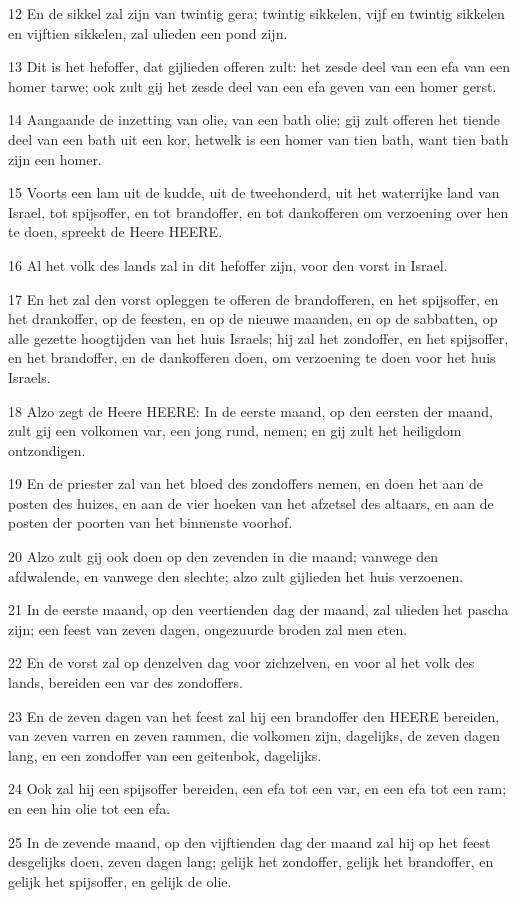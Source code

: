 \par 12 En de sikkel zal zijn van twintig gera; twintig sikkelen, vijf en twintig sikkelen en vijftien sikkelen, zal ulieden een pond zijn.
\par 13 Dit is het hefoffer, dat gijlieden offeren zult: het zesde deel van een efa van een homer tarwe; ook zult gij het zesde deel van een efa geven van een homer gerst.
\par 14 Aangaande de inzetting van olie, van een bath olie; gij zult offeren het tiende deel van een bath uit een kor, hetwelk is een homer van tien bath, want tien bath zijn een homer.
\par 15 Voorts een lam uit de kudde, uit de tweehonderd, uit het waterrijke land van Israel, tot spijsoffer, en tot brandoffer, en tot dankofferen om verzoening over hen te doen, spreekt de Heere HEERE.
\par 16 Al het volk des lands zal in dit hefoffer zijn, voor den vorst in Israel.
\par 17 En het zal den vorst opleggen te offeren de brandofferen, en het spijsoffer, en het drankoffer, op de feesten, en op de nieuwe maanden, en op de sabbatten, op alle gezette hoogtijden van het huis Israels; hij zal het zondoffer, en het spijsoffer, en het brandoffer, en de dankofferen doen, om verzoening te doen voor het huis Israels.
\par 18 Alzo zegt de Heere HEERE: In de eerste maand, op den eersten der maand, zult gij een volkomen var, een jong rund, nemen; en gij zult het heiligdom ontzondigen.
\par 19 En de priester zal van het bloed des zondoffers nemen, en doen het aan de posten des huizes, en aan de vier hoeken van het afzetsel des altaars, en aan de posten der poorten van het binnenste voorhof.
\par 20 Alzo zult gij ook doen op den zevenden in die maand; vanwege den afdwalende, en vanwege den slechte; alzo zult gijlieden het huis verzoenen.
\par 21 In de eerste maand, op den veertienden dag der maand, zal ulieden het pascha zijn; een feest van zeven dagen, ongezuurde broden zal men eten.
\par 22 En de vorst zal op denzelven dag voor zichzelven, en voor al het volk des lands, bereiden een var des zondoffers.
\par 23 En de zeven dagen van het feest zal hij een brandoffer den HEERE bereiden, van zeven varren en zeven rammen, die volkomen zijn, dagelijks, de zeven dagen lang, en een zondoffer van een geitenbok, dagelijks.
\par 24 Ook zal hij een spijsoffer bereiden, een efa tot een var, en een efa tot een ram; en een hin olie tot een efa.
\par 25 In de zevende maand, op den vijftienden dag der maand zal hij op het feest desgelijks doen, zeven dagen lang; gelijk het zondoffer, gelijk het brandoffer, en gelijk het spijsoffer, en gelijk de olie.

